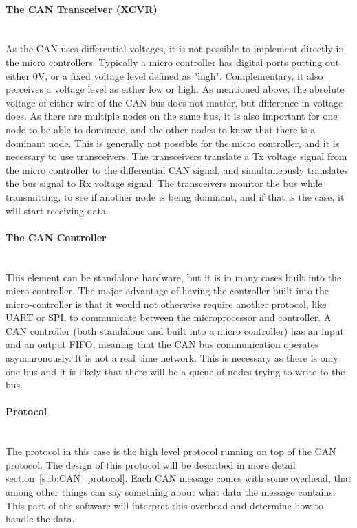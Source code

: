 \paragraph*{The CAN Transceiver (XCVR)}~\\
As the CAN uses differential voltages, it is not possible to implement directly in the micro controllers.
Typically a micro controller has digital ports putting out either $ 0 \si{\volt}$, or a fixed voltage level defined as "high".
Complementary, it also perceives a voltage level as either low or high. 
As mentioned above, the absolute voltage of either wire of the CAN bus does not matter, but difference in voltage does. 
As there are multiple nodes on the same bus, it is also important for one node to be able to dominate, and the other nodes to know that there is a dominant node. 
This is generally not possible for the micro controller, and it is necessary to use transceivers.
The transceivers translate a Tx voltage signal from the micro controller to the differential CAN signal, and simultaneously translates the bus signal to Rx voltage signal.
The transceivers monitor the bus while transmitting, to see if another node is being dominant, and if that is the case, it will start receiving data.

\paragraph*{The CAN Controller}~\\
This element can be standalone hardware, but it is in many cases built into the micro-controller.
The major advantage of having the controller built into the micro-controller is that it would not otherwise require another protocol, like UART or SPI, to communicate between the microprocessor and controller.
A CAN controller (both standalone and built into a micro controller) has an input and an output FIFO, meaning that the CAN bus communication operates asynchronously. 
It is not a real time network.
This is necessary as there is only one bus and it is likely that there will be a queue of nodes trying to write to the bus.

\paragraph*{Protocol}~\\
The protocol in this case is the high level protocol running on top of the CAN protocol.
The design of this protocol will be described in more detail section~\ref{sub:CAN_protocol}. 
Each CAN message comes with some overhead, that among other things can say something about what data the message contains.
This part of the software will interpret this overhead and determine how to handle the data.\\

